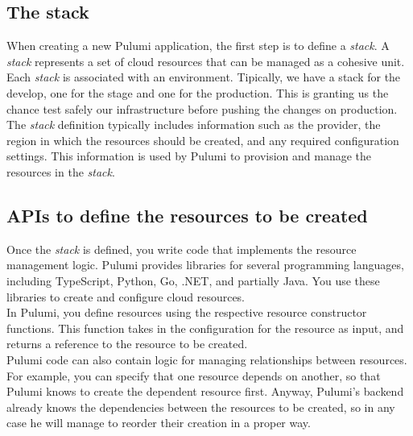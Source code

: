 \subsection{The stack}
When creating a new Pulumi application, the first step is to define a \textit{stack}.
A \textit{stack} represents a set of cloud resources that can be managed as a cohesive unit.\\
Each \textit{stack} is associated with an environment.
Tipically, we have a stack for the develop, one for the stage and one for the production.
This is granting us the chance test safely our infrastructure before pushing the changes on production.\\
The \textit{stack} definition typically includes information such as the provider, the region in which the resources should be created, and any required configuration settings.
This information is used by Pulumi to provision and manage the resources in the \textit{stack}.

\subsection{APIs to define the resources to be created}
Once the \textit{stack} is defined, you write code that implements the resource management logic.
Pulumi provides libraries for several programming languages, including TypeScript, Python, Go, .NET, and partially Java.
You use these libraries to create and configure cloud resources.\\
In Pulumi, you define resources using the respective resource constructor functions.
This function takes in the configuration for the resource as input, and returns a reference to the resource to be created.\\
Pulumi code can also contain logic for managing relationships between resources.
For example, you can specify that one resource depends on another, so that Pulumi knows to create the dependent resource first.
Anyway, Pulumi's backend already knows the dependencies between the resources to be created, so in any case he will manage to reorder their creation in a proper way.


